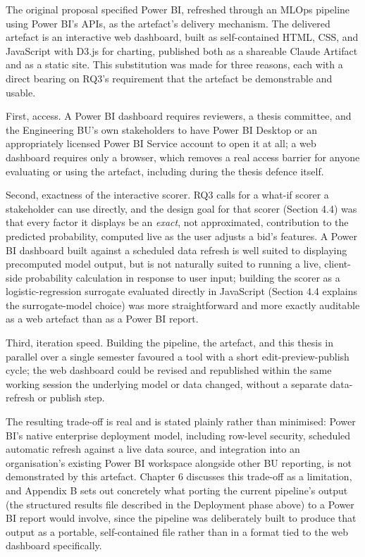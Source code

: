 The original proposal specified Power BI, refreshed through an MLOps
pipeline using Power BI's APIs, as the artefact's delivery mechanism.
The delivered artefact is an interactive web dashboard, built as
self-contained HTML, CSS, and JavaScript with D3.js for charting,
published both as a shareable Claude Artifact and as a static site. This
substitution was made for three reasons, each with a direct bearing on
RQ3's requirement that the artefact be demonstrable and usable.

First, access. A Power BI dashboard requires reviewers, a thesis
committee, and the Engineering BU's own stakeholders to have Power BI
Desktop or an appropriately licensed Power BI Service account to open it
at all; a web dashboard requires only a browser, which removes a real
access barrier for anyone evaluating or using the artefact, including
during the thesis defence itself.

Second, exactness of the interactive scorer. RQ3 calls for a what-if
scorer a stakeholder can use directly, and the design goal for that
scorer (Section 4.4) was that every factor it displays be an
\emph{exact}, not approximated, contribution to the predicted
probability, computed live as the user adjusts a bid's features. A Power
BI dashboard built against a scheduled data refresh is well suited to
displaying precomputed model output, but is not naturally suited to
running a live, client-side probability calculation in response to user
input; building the scorer as a logistic-regression surrogate evaluated
directly in JavaScript (Section 4.4 explains the surrogate-model choice)
was more straightforward and more exactly auditable as a web artefact
than as a Power BI report.

Third, iteration speed. Building the pipeline, the artefact, and this
thesis in parallel over a single semester favoured a tool with a short
edit-preview-publish cycle; the web dashboard could be revised and
republished within the same working session the underlying model or data
changed, without a separate data-refresh or publish step.

The resulting trade-off is real and is stated plainly rather than
minimised: Power BI's native enterprise deployment model, including
row-level security, scheduled automatic refresh against a live data
source, and integration into an organisation's existing Power BI
workspace alongside other BU reporting, is not demonstrated by this
artefact. Chapter 6 discusses this trade-off as a limitation, and
Appendix B sets out concretely what porting the current pipeline's
output (the structured results file described in the Deployment phase
above) to a Power BI report would involve, since the pipeline was
deliberately built to produce that output as a portable, self-contained
file rather than in a format tied to the web dashboard specifically.

